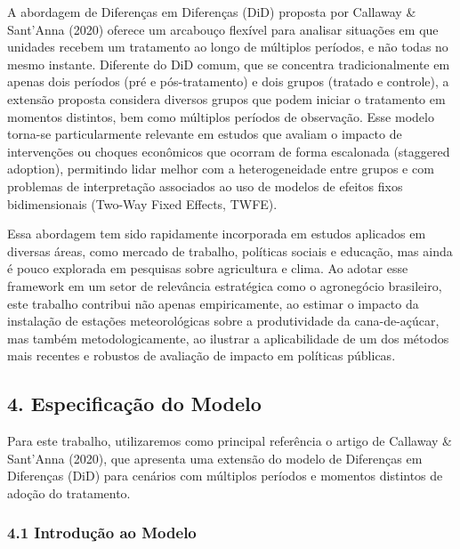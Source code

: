 \documentclass[
  brazilian,
  12pt,
  a4paper,
]{article}
\begin{document}
A abordagem de Diferenças em Diferenças (DiD) proposta por Callaway \&
Sant'Anna (2020) oferece um arcabouço flexível para analisar situações
em que unidades recebem um tratamento ao longo de múltiplos períodos, e
não todas no mesmo instante. Diferente do DiD comum, que se concentra
tradicionalmente em apenas dois períodos (pré e pós-tratamento) e dois
grupos (tratado e controle), a extensão proposta considera diversos
grupos que podem iniciar o tratamento em momentos distintos, bem como
múltiplos períodos de observação. Esse modelo torna-se particularmente
relevante em estudos que avaliam o impacto de intervenções ou choques
econômicos que ocorram de forma escalonada (staggered adoption),
permitindo lidar melhor com a heterogeneidade entre grupos e com
problemas de interpretação associados ao uso de modelos de efeitos fixos
bidimensionais (Two-Way Fixed Effects, TWFE).

Essa abordagem tem sido rapidamente incorporada em estudos aplicados em
diversas áreas, como mercado de trabalho, políticas sociais e educação,
mas ainda é pouco explorada em pesquisas sobre agricultura e clima. Ao
adotar esse framework em um setor de relevância estratégica como o
agronegócio brasileiro, este trabalho contribui não apenas
empiricamente, ao estimar o impacto da instalação de estações
meteorológicas sobre a produtividade da cana-de-açúcar, mas também
metodologicamente, ao ilustrar a aplicabilidade de um dos métodos mais
recentes e robustos de avaliação de impacto em políticas públicas.

\subsection{\texorpdfstring{\textbf{4. Especificação do
Modelo}}{4. Especificação do Modelo}}\label{especificauxe7uxe3o-do-modelo}

Para este trabalho, utilizaremos como principal referência o artigo de
Callaway \& Sant'Anna (2020), que apresenta uma extensão do modelo de
Diferenças em Diferenças (DiD) para cenários com múltiplos períodos e
momentos distintos de adoção do tratamento.

\subsubsection{\texorpdfstring{\textbf{4.1 Introdução ao
Modelo}}{4.1 Introdução ao Modelo}}\label{introduuxe7uxe3o-ao-modelo}
\end{document}
